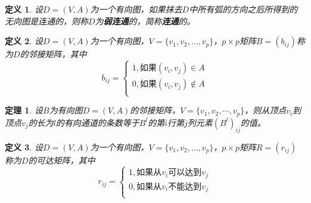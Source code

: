 \documentclass{article}
\newtheorem{Def}{定义}
\newtheorem{Thm}{定理}
\begin{document}
\begin{CJK*}{UTF8}{gbsn}
   \begin{Def}
   设$D=(V,A)$为一个有向图，如果抹去$D$中所有弧的方向之后所得到的无向图是连通的，则称$D$为{\bfseries 弱连通}的，简称{\bfseries 连通}的。 
  \end{Def}
  \centering

 \begin{Def}
   设$D=(V,A)$为一个有向图，$V=\{v_1,v_2,\ldots, v_p\}$，$p\times p$矩阵$B=(b_{ij})$称为$D$的邻接矩阵，其中
  \[b_{ij}=\begin{cases}
      1, \text{如果}(v_i,v_j)\in A\\
      0, \text{如果}(v_i,v_j)\notin A\\
    \end{cases}
  \]
 \end{Def}
   \begin{Thm}
   设$B$为有向图$D=(V,A)$的邻接矩阵，$V=\{v_1,v_2,\cdots,v_p\}$，则从顶点$v_i$到顶点$v_j$的长为$l$的有向通道的条数等于$B^l$的第$i$行第$j$列元素$(B^l)_{ij}$的值。 
  \end{Thm}
 \begin{Def}
   设$D=(V,A)$为一个有向图，$V=\{v_1,v_2,\ldots, v_p\}$，$p\times p$矩阵$R=(r_{ij})$称为$D$的可达矩阵，其中
  \[r_{ij}=\begin{cases}
      1, \text{如果从}v_i\text{可以达到}v_j\\
      0, \text{如果从}v_i\text{不能达到}v_j\\
    \end{cases}
  \]
 \end{Def}


\end{CJK*}
\end{document}
